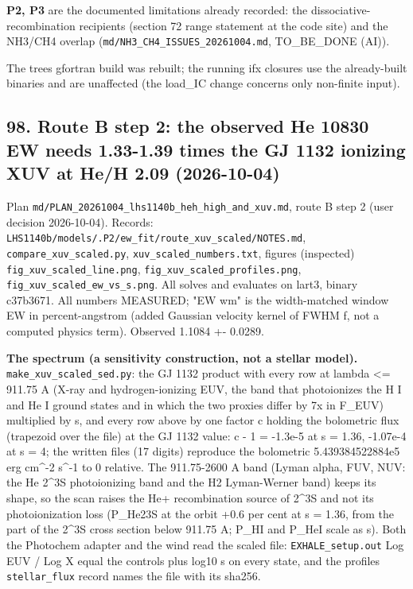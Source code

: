 \documentclass[english,a4paper]{my_memo}
\begin{document}
\textbf{P2, P3} are the documented limitations already recorded: the
dissociative-recombination recipients (section 72 range statement at the
code site) and the NH3/CH4 overlap (\texttt{md/NH3\_CH4\_ISSUES\_20261004.md},
TO\_BE\_DONE (AI)).

The tree\textquotesingle s gfortran build was rebuilt; the running ifx closures use the
already-built binaries and are unaffected (the load\_IC change concerns only
non-finite input).

\subsection{98. Route B step 2: the observed He 10830 EW needs 1.33-1.39 times the GJ 1132 ionizing XUV at He/H 2.09 (2026-10-04)}\label{98-route-b-step-2-the-observed-he-10830-ew-needs-133-139-times-the-gj-1132-ionizing-xuv-at-heh-209-2026-10-04}

Plan \texttt{md/PLAN\_20261004\_lhs1140b\_heh\_high\_and\_xuv.md}, route B step 2 (user
decision 2026-10-04). Records:
\texttt{LHS1140b/models/.P2/ew\_fit/route\_xuv\_scaled/NOTES.md},
\texttt{compare\_xuv\_scaled.py}, \texttt{xuv\_scaled\_numbers.txt}, figures (inspected)
\texttt{fig\_xuv\_scaled\_line.png}, \texttt{fig\_xuv\_scaled\_profiles.png},
\texttt{fig\_xuv\_scaled\_ew\_vs\_s.png}. All solves and evaluates on lart3, binary
c37b3671. All numbers MEASURED; "EW wm" is the width-matched window EW in
percent-angstrom (added Gaussian velocity kernel of FWHM f, not a computed
physics term). Observed 1.1084 +- 0.0289.

\textbf{The spectrum (a sensitivity construction, not a stellar model).}
\texttt{make\_xuv\_scaled\_sed.py}: the GJ 1132 product with every row at lambda \textless=
911.75 A (X-ray and hydrogen-ionizing EUV, the band that photoionizes the
H I and He I ground states and in which the two proxies differ by 7x in
F\_EUV) multiplied by s, and every row above by one factor c holding the
bolometric flux (trapezoid over the file) at the GJ 1132 value: c - 1 =
-1.3e-5 at s = 1.36, -1.07e-4 at s = 4; the written files (17 digits)
reproduce the bolometric 5.439384522884e5 erg cm\^{}-2 s\^{}-1 to 0 relative. The
911.75-2600 A band (Lyman alpha, FUV, NUV: the He 2\^{}3S photoionizing band and
the H2 Lyman-Werner band) keeps its shape, so the scan raises the He+
recombination source of 2\^{}3S and not its photoionization loss (P\_He23S at
the orbit +0.6 per cent at s = 1.36, from the part of the 2\^{}3S cross section
below 911.75 A; P\_HI and P\_HeI scale as s). Both the Photochem adapter and
the wind read the scaled file: \texttt{EXHALE\_setup.out} Log EUV / Log X equal the
control\textquotesingle s plus log10 s on every state, and the profile\textquotesingle s \texttt{stellar\_flux} record names the
file with its sha256.
\end{document}
